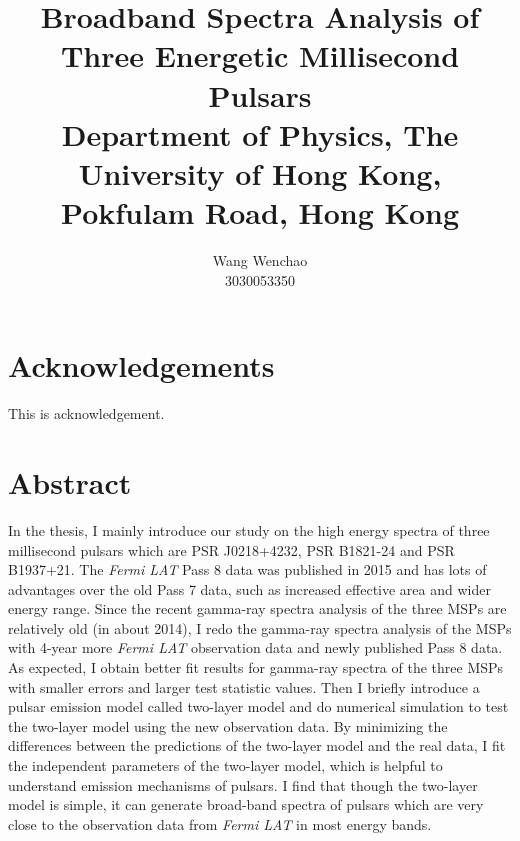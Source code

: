 \documentclass[12pt]{report}
\title{\textbf{Broadband Spectra Analysis of Three Energetic Millisecond Pulsars}\\ \vspace{1cm}
			{\large Department of Physics, The University of Hong Kong, Pokfulam Road, Hong Kong}\\ \vspace{1cm}
}
\date{}
\author{Wang Wenchao  \\3030053350}
\begin{document}
\maketitle



\cleardoublepage
{}
\chapter*{Acknowledgements}
  This is acknowledgement. 
  

\cleardoublepage
{}
\chapter*{Abstract}
  \doublespacing
  In the thesis, I mainly introduce our study on the high energy spectra of three 
  millisecond pulsars which are PSR J0218+4232, PSR B1821-24 and PSR B1937+21. 
  The \textit{Fermi LAT} Pass 8 data was published in 2015 and has lots of advantages over 
  the old Pass 7 data, such as increased effective area and wider energy range. Since 
  the recent gamma-ray spectra analysis of the three MSPs are relatively old (in about 2014), 
  I redo the gamma-ray spectra analysis of the MSPs with 
  4-year more \textit{Fermi LAT} observation data and newly published Pass 8 data. 
  As expected, I obtain better fit results for gamma-ray spectra of 
  the three MSPs with smaller errors and larger test statistic values. Then I briefly 
  introduce a pulsar emission model called two-layer model \cite{0004-637X-787-2-167} and 
  do numerical simulation to test the two-layer model using the new observation data.
  By minimizing the differences between the predictions of the two-layer model and the real 
  data, I fit the independent parameters of the two-layer model, which is helpful to
  understand emission mechanisms of pulsars. I find that though the two-layer model is 
  simple, it can generate broad-band spectra of pulsars which are very close to the 
  observation data from \textit{Fermi LAT} in most energy bands.
			
\cleardoublepage
{}
\newpage

\cleardoublepage
{}

\tableofcontents


\listoffigures
\end{document}

